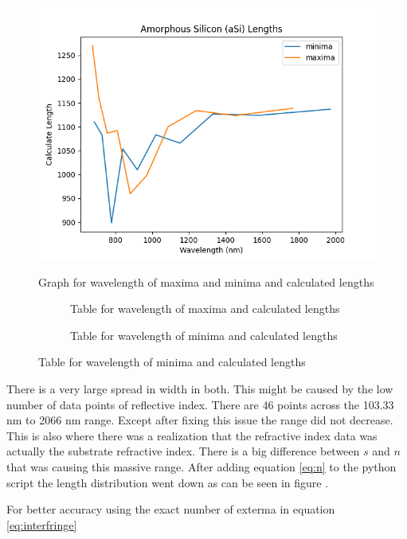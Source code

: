 \documentclass[10pt,a4paper]{article}
\begin{document}
\begin{multicols}{2}
\begin{figure}[H]\centering\label{AmSiLengthGraph}
\includegraphics[scale=0.5]{asilength}
\caption{Graph for wavelength of maxima and minima and calculated lengths}
\end{figure}

\begin{figure}[H]\centering
\begin{subfigure}[b]{0.3\textwidth}\centering\label{AmSiLengthTable max}
\caption{Table for wavelength of maxima and calculated lengths}
\end{subfigure}
\begin{subfigure}[b]{0.3\textwidth}\centering\label{AmSiLengthTable max}
\caption{Table for wavelength of minima and calculated lengths}
\end{subfigure}
\end{figure}
There is a very large spread in width in both. This might be caused by the low number of data points of reflective index. There are 46 points across the 103.33 nm to 2066 nm range. Except after fixing this issue the range did not decrease. This is also where there was a realization that the refractive index data was actually the substrate refractive index. There is a big difference between $s$ and $n$ that was causing this massive range. After adding equation \ref{eq:n} to the python script the length distribution went down as can be seen in figure .

For better accuracy using the exact number of exterma in equation \ref{eq:interfringe}\\



\end{multicols}
\end{document}
